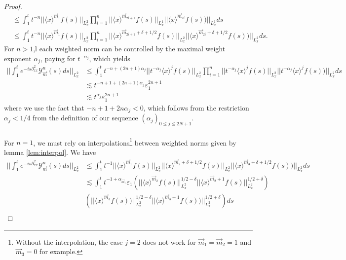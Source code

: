 \documentclass[a4paper, 15pt]{article}
\numberwithin{equation}{section}
\begin{document}
\begin{proof}
\begin{align*}
&\leq \int^t_1t^{-n}||\langle x\rangle^{\overrightarrow{m}_{1}}f(s)||_{L^2_x}\prod^{n}_{i=1}||\langle x\rangle^{\overrightarrow{m}_{2i+1}}f(s)||_{L^1_x}||\langle x\rangle^{\overrightarrow{m}_{2i}}f(s))||_{L^1_x}ds\\
&\leq \int^t_1t^{-n}||\langle x\rangle^{\overrightarrow{m}_{1}}f(s)||_{L^2_x}\prod^{n}_{i=1}||\langle x\rangle^{\overrightarrow{m}_{2i+1}+\delta+1/2}f(s)||_{L^2_x}||\langle x\rangle^{\overrightarrow{m}_{2i}+\delta+1/2}f(s))||_{L^2_x}ds.
\end{align*}
For $n>1$,l each weighted norm can be controlled by the maximal weight exponent $\alpha_j$, paying for $t^{-\alpha_j}$, which yields
\begin{align*}
||\int^t_1e^{-is\partial^2_{xx}}\mathcal{Y}^{n}_{\overrightarrow{m}}(s)ds||_{L^2_x}&\leq \int^t_1t^{-n+(2n+1)\alpha_j}||t^{-\alpha_j}\langle x\rangle^{j}f(s)||_{L^2_x}\prod^{n}_{i=1}||t^{-\alpha_j}\langle x\rangle^{j}f(s)||_{L^2_x}||t^{-\alpha_j}\langle x\rangle^{j}f(s))||_{L^2_x}ds\\
&\lesssim t^{-n+1+(2n+1)\alpha_j}\varepsilon^{2n+1}_1\\
&\lesssim t^{\alpha_j}\varepsilon^{2n+1}_1
\end{align*}
where we use the fact that $-n+1+2n\alpha_j<0$, which follows from the restriction $\alpha_j<1/4$ from the definition of our sequence $(\alpha_j)_{0\leq j\leq 2N+1}$.\\\\
For $n=1$, we must rely on interpolations\footnote{Without the interpolation, the case $j=2$ does not work for $\overrightarrow{m}_1=\overrightarrow{m}_2=1$ and $\overrightarrow{m}_3=0$ for example.} between weighted norms given by lemma \ref{lem:interpol}. We have
\begin{align*}
||\int^t_1e^{-is\partial^2_{xx}}\mathcal{Y}^{n}_{\overrightarrow{m}}(s)ds||_{L^2_x}&\leq \int^t_1t^{-1}||\langle x\rangle^{\overrightarrow{m}_{1}}f(s)||_{L^2_x}||\langle x\rangle^{\overrightarrow{m}_{2}+\delta+1/2}f(s)||_{L^2_x}||\langle x\rangle^{\overrightarrow{m}_{3}+\delta+1/2}f(s))||_{L^2_x}ds\\
&\lesssim \int^t_1t^{-1+\alpha_{\overrightarrow{m}_1}}\varepsilon_{1}\left(||\langle x\rangle^{\overrightarrow{m}_{2}}f(s)||_{L^2_x}^{1/2-\delta}||\langle x\rangle^{\overrightarrow{m}_{2}+1}f(s)||_{L^2_x}^{1/2+\delta}\right)\\
&\left(||\langle x\rangle^{\overrightarrow{m}_{3}}f(s))||_{L^2_x}^{1/2-\delta}||\langle x\rangle^{\overrightarrow{m}_{3}+1}f(s))||_{L^2_x}^{1/2+\delta}\right)ds\\

\end{align*}
\end{proof}
\end{document}

